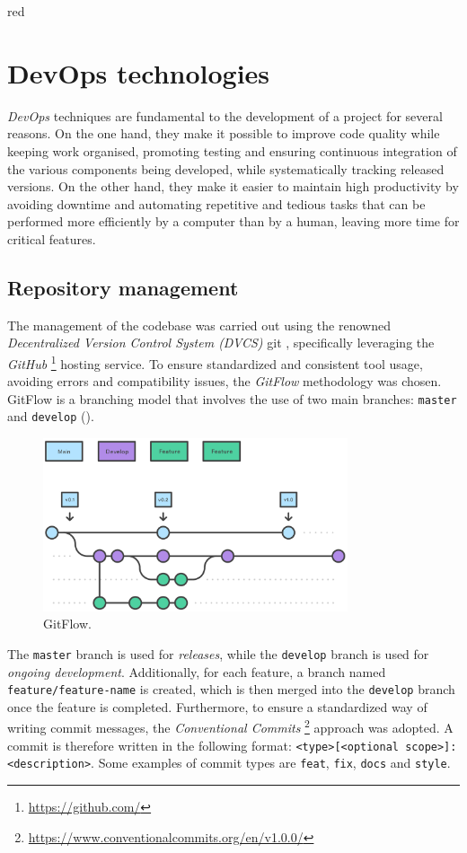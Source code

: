 \documentclass[12pt,a4paper,openright,twoside]{book}
\begin{document}
\begin{color}{red}
\section{DevOps technologies}
\end{color}

\emph{DevOps} techniques are fundamental to the development of a project for several reasons. On the one hand, 
    they make it possible to improve code quality while keeping work organised, promoting testing and 
    ensuring continuous integration of the various components being developed, while systematically 
    tracking released versions. On the other hand, they make it easier to maintain high productivity 
    by avoiding downtime and automating repetitive and tedious tasks that can be performed more efficiently 
    by a computer than by a human, leaving more time for critical features.

\subsection*{Repository management}
The management of the codebase was carried out using the renowned \emph{Decentralized Version Control System (DVCS)} git \cite{spinellis2012git}, 
    specifically leveraging the \emph{GitHub} \footnote{\url{https://github.com/}} hosting service. To ensure standardized and consistent tool usage, 
    avoiding errors and compatibility issues, the \emph{GitFlow} methodology was chosen.
    GitFlow is a branching model that involves the use of two main branches: \texttt{master} and \texttt{develop} ().
    \begin{figure}[t]
        \centering
        \includegraphics[width=0.8\textwidth]{figures/gitflow.png}
        \caption{GitFlow.}
        \label{fig:gitflow}
    \end{figure}
    The \texttt{master} branch is used for \emph{releases}, while the \texttt{develop} branch is used for \emph{ongoing development}. 
    Additionally, for each feature, a branch named \texttt{feature/feature-name} is created, which is then merged 
    into the \texttt{develop} branch once the feature is completed.
    Furthermore, to ensure a standardized way of writing commit messages, 
        the \emph{Conventional Commits} \footnote{\url{https://www.conventionalcommits.org/en/v1.0.0/}} 
        approach was adopted. A commit is therefore written in the following format: \texttt{<type>[<optional scope>]: <description>}.
        Some examples of commit types are \texttt{feat}, \texttt{fix}, \texttt{docs} and \texttt{style}.
\end{document}
